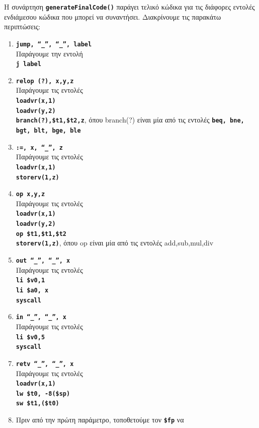 \documentclass[a4paper]{article}
\let\OldTexttt\texttt
\renewcommand{\texttt}[1]{\OldTexttt{\textbf{#1}}}
\begin{document}
Η συνάρτηση \texttt{generateFinalCode()} παράγει τελικό κώδικα για τις
διάφορες εντολές ενδιάμεσου κώδικα που μπορεί να συναντήσει. Διακρίνουμε
τις παρακάτω περιπτώσεις:
\begin{enumerate}
    \item \texttt{jump, “\_”, “\_”, label} \\ Παράγουμε την εντολή \\
        \texttt{j label} 
    \item \texttt{relop (?), x,y,z} \\ Παράγουμε τις εντολές \\
        \texttt{loadvr(x,1) \\ loadvr(y,2) \\ branch(?),\$t1,\$t2,z}, όπου
        branch(?) είναι μία από τις εντολές \texttt{beq, bne, bgt, blt,
        bge, ble}
    \item \texttt{:=, x, “\_”, z} \\ Παράγουμε τις εντολές \\
        \texttt{loadvr(x,1) \\ storerv(1,z)} 
    \item \texttt{op x,y,z} \\ Παράγουμε τις εντολές \\ \texttt{loadvr(x,1)
        \\ loadvr(y,2) \\ op \$t1,\$t1,\$t2 \\ storerv(1,z)}, όπου op είναι
        μία από τις εντολές add,sub,mul,div
    \item \texttt{out “\_”, “\_”, x} \\ Παράγουμε τις εντολές \\ \texttt{li
        \$v0,1 \\ li \$a0, x \\ syscall} 
    \item \texttt{in “\_”, “\_”, x} \\ Παράγουμε τις εντολές \\ \texttt{li
        \$v0,5 \\ syscall} 
    \item \texttt{retv “\_”, “\_”, x} \\ Παράγουμε τις εντολές\\
        \texttt{loadvr(x,1) \\ lw \$t0, -8(\$sp) \\ sw \$t1,(\$t0)} 
    \item Πριν από την πρώτη παράμετρο, τοποθετούμε τον \texttt{\$fp} να

\end{enumerate}
\end{document}
